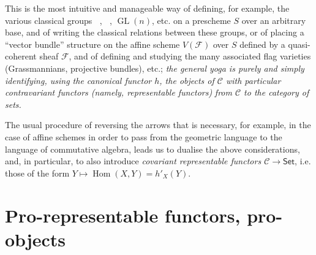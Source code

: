 \documentclass{article}
\newcommand{\scr}[1]{{\mathscr{#1}}}
\renewcommand{\cal}[1]{{\mathcal{#1}}}
\newcommand{\Set}{\mathsf{Set}}
\DeclareMathOperator{\Hom}{Hom}
\DeclareMathOperator{\GL}{GL}
\DeclareMathOperator{\Ga}{G_a}
\DeclareMathOperator{\Gm}{G_m}
\newcommand{\oldpage}[1]{\marginpar{\footnotesize$\Big\vert$ \textit{p.~#1}}}
\begin{document}
This is the most intuitive and manageable way of defining, for example, the various classical groups $\Ga$, $\Gm$, $\GL(n)$, etc. on a prescheme $S$ over an arbitrary base, and of writing the classical relations between these groups, or of placing a ``vector bundle'' structure on the affine scheme $V(\scr{F})$ over $S$ defined by a quasi-coherent sheaf $\scr{F}$, and of defining and studying the many associated flag varieties (Grassmannians, projective bundles), etc.;
\emph{the general yoga is purely and simply identifying, using the canonical functor $h$, the objects of $\cal{C}$ with particular contravariant functors (namely, representable functors)}
\oldpage{195-03}
\emph{from $\cal{C}$ to the category of sets.}

The usual procedure of reversing the arrows that is necessary, for example, in the case of affine schemes in order to pass from the geometric language to the language of commutative algebra, leads us to dualise the above considerations, and, in particular, to also introduce \emph{covariant representable functors $\cal{C}\to\Set$}, i.e. those of the form $Y\mapsto\Hom(X,Y)=h'_X(Y)$.


\section{Pro-representable functors, pro-objects}
\label{A.2}
\end{document}

